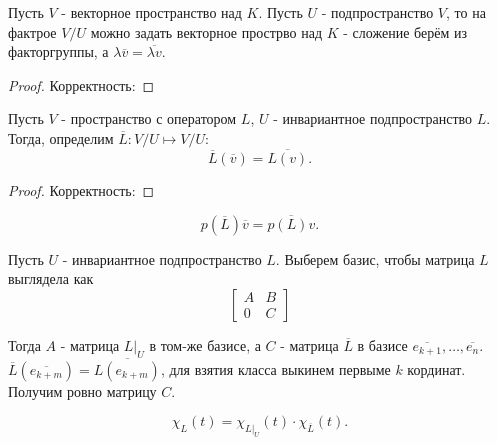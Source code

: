 \begin{definition} \thmslashn 

    Пусть $V$ - векторное пространство над $K$. Пусть $U$ - подпространство $V$, то на фактрое $V / U$ можно задать векторное прострво над $K$ - сложение берём из факторгруппы, а $\lambda \overline{v} = \overline{\lambda v}$.
    \begin{proof} \thmslashn
    
        Корректность: \TODO
    \end{proof}
\end{definition}
\begin{definition} \thmslashn 

    Пусть $V$ - пространство с оператором $L$, $U$ - инвариантное подпространство $L$. Тогда, определим $\overline{L} : V / U \mapsto V / U$: 
    \[ \overline{L}(\overline{v}) = \overline{L(v)} .\]
    \begin{proof} \thmslashn
    
        Корректность: \TODO
    \end{proof}
\end{definition}
\begin{remark} \thmslashn

    \[ p(\overline{L})\overline{v} = \overline{p(L)v} .\] 
\end{remark}
\begin{remark} \thmslashn

    Пусть $U$ - инвариантное подпространство $L$. Выберем базис, чтобы матрица $L$ выглядела как
    \begin{equation*}
        \begin{bmatrix} A & B\\ 0 & C \end{bmatrix} 
    \end{equation*}

    Тогда $A$ - матрица $\left. L\right|_{U}$ в том-же базисе, а $C$ - матрица $\overline{L}$ в базисе $\overline{e_{k+1}}, \ldots, \overline{e_{n}}$. $\overline{L}(\overline{e_{k+m}}) = \overline{L(e_{k+m})}$, для взятия класса выкинем первыме $k$ кординат. Получим ровно матрицу $C$.
\end{remark}
\begin{consequence} \thmslashn

    \[ \chi_{L}(t) = \chi_{\left. L\right|_{U}}(t) \cdot \chi_{\overline{L}}(t) .\] 
\end{consequence}
